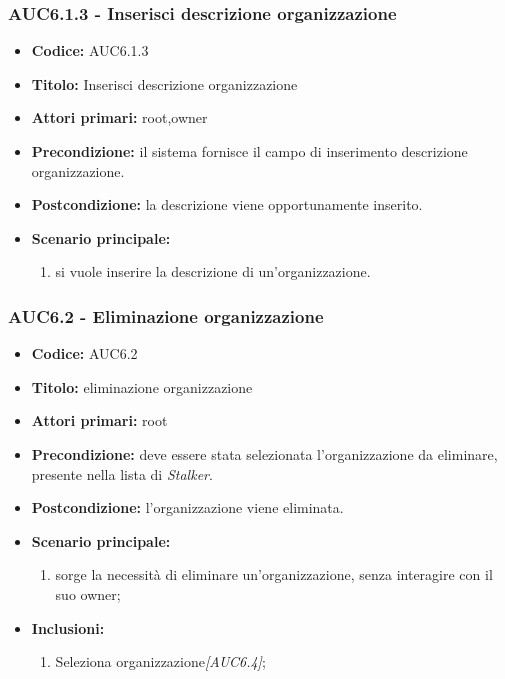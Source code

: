 \documentclass[casi-duso]{subfiles}
\begin{document}
  \subsubsection{AUC6.1.3 - Inserisci descrizione organizzazione}%
  \label{subsub:AUC6.1.3}
  \begin{itemize}
    \item \textbf{Codice:} AUC6.1.3
    \item \textbf{Titolo:} Inserisci descrizione organizzazione
    \item \textbf{Attori primari:} root,owner
    \item \textbf{Precondizione:} il sistema fornisce il campo di inserimento descrizione organizzazione.
    \item \textbf{Postcondizione:} la descrizione viene opportunamente inserito.
    \item \textbf{Scenario principale:}
    \begin{enumerate}
      \item si vuole inserire la descrizione di un'organizzazione.
    \end{enumerate}
  \end{itemize}



\subsubsection{AUC6.2 - Eliminazione organizzazione}%
\label{subsub:AUC6.2}
\begin{itemize}
  \item \textbf{Codice:} AUC6.2
  \item \textbf{Titolo:} eliminazione organizzazione
  \item \textbf{Attori primari:} root
  \item \textbf{Precondizione:} deve essere stata selezionata l'organizzazione da eliminare, presente nella lista di \emph{Stalker}.
  \item \textbf{Postcondizione:} l'organizzazione viene eliminata.
  \item \textbf{Scenario principale:}
  \begin{enumerate}
    \item sorge la necessità di eliminare un'organizzazione, senza interagire con il suo owner;
  \end{enumerate}
  \item \textbf{Inclusioni:}
  \begin{enumerate}
    \item Seleziona organizzazione\emph{[AUC6.4]};
  \end{enumerate}
\end{itemize}
\end{document}
